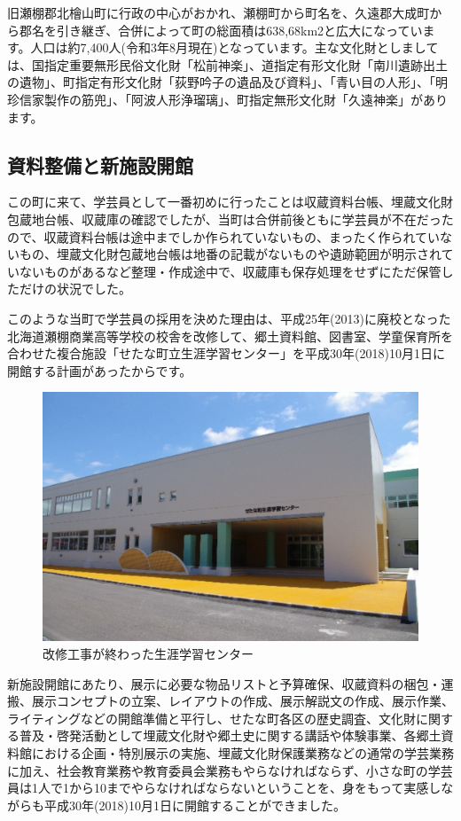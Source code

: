 \documentclass[a4j,11pt,twocolumn,openany]{jsbook}
\begin{document}
旧瀬棚郡北檜山町に行政の中心がおかれ、瀬棚町から町名を、久遠郡大成町から郡名を引き継ぎ、合併によって町の総面積は638,68km2と広大になっています。人口は約7,400人(令和3年8月現在)となっています。主な文化財としましては、国指定重要無形民俗文化財「松前神楽」、道指定有形文化財「南川遺跡出土の遺物」、町指定有形文化財「荻野吟子の遺品及び資料」、「青い目の人形」、「明珍信家製作の筋兜」、「阿波人形浄瑠璃」、町指定無形文化財「久遠神楽」があります。

\newpage
\subsection{資料整備と新施設開館}
この町に来て、学芸員として一番初めに行ったことは収蔵資料台帳、埋蔵文化財包蔵地台帳、収蔵庫の確認でしたが、当町は合併前後ともに学芸員が不在だったので、収蔵資料台帳は途中までしか作られていないもの、まったく作られていないもの、埋蔵文化財包蔵地台帳は地番の記載がないものや遺跡範囲が明示されていないものがあるなど整理・作成途中で、収蔵庫も保存処理をせずにただ保管しただけの状況でした。

このような当町で学芸員の採用を決めた理由は、平成25年(2013)に廃校となった北海道瀬棚商業高等学校の校舎を改修して、郷土資料館、図書室、学童保育所を合わせた複合施設「せたな町立生涯学習センター」を平成30年(2018)10月1日に開館する計画があったからです。

\begin{figure}[H]
	\centering
	\includegraphics[width=\linewidth]{fig/04_Kudo/fig02.png}
	\caption{改修工事が終わった生涯学習センター}
	\label{}
\end{figure}

新施設開館にあたり、展示に必要な物品リストと予算確保、収蔵資料の梱包・運搬、展示コンセプトの立案、レイアウトの作成、展示解説文の作成、展示作業、ライティングなどの開館準備と平行し、せたな町各区の歴史調査、文化財に関する普及・啓発活動として埋蔵文化財や郷土史に関する講話や体験事業、各郷土資料館における企画・特別展示の実施、埋蔵文化財保護業務などの通常の学芸業務に加え、社会教育業務や教育委員会業務もやらなければならず、小さな町の学芸員は1人で1から10までやらなければならないということを、身をもって実感しながらも平成30年(2018)10月1日に開館することができました。
\end{document}
